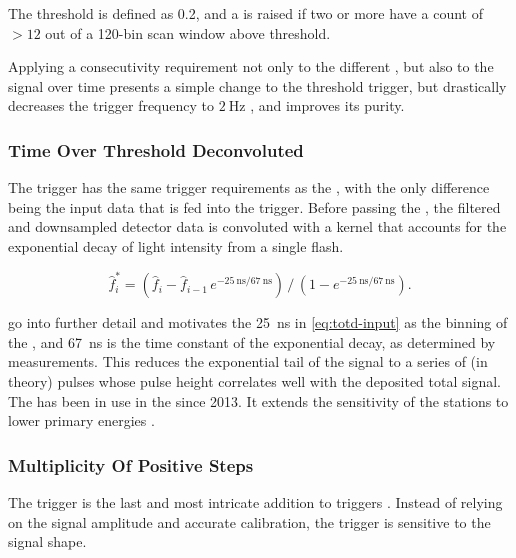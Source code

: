 The threshold is defined as \SI{0.2}{\VemOnline}, and a \TTWO is raised if two 
or more \PMTs have a count of $>12$ out of a 120-bin scan window above 
threshold.

Applying a consecutivity requirement not only to the different \PMTs, but also 
to the signal over time presents a simple change to the \SB threshold trigger, 
but drastically decreases the trigger frequency to $\SI{2}{\hertz}$ 
\cite{ramellaT3RateCompatibility2025}, and improves its purity.

\subsubsection{Time Over Threshold Deconvoluted}

The \ToTd trigger has the same trigger requirements as the \ToT, with the only
difference being the input data that is fed into the trigger. Before passing 
the \ToTd, the filtered and downsampled detector data is convoluted with a 
kernel that accounts for the exponential decay of light intensity from a single
flash.

\begin{equation}
\label{eq:totd-input}
\hat{f}^*_i = \left( \hat{f}_i - \hat{f}_{i-1} \, e^{-\SI{25}{\nano\second}/\SI{67}{\nano\second}} \right)\,/\,\left( 1 - e^{-\SI{25}{\nano\second}/\SI{67}{\nano\second} } \right).
\end{equation}

\cite{billoirPeakSearchingSurface2002, colemanNewTriggerSettings2018} go into 
further detail and motivates the \SI{25}{\nano\second} in \cref{eq:totd-input} 
as the binning of the \UB, and \SI{67}{\nano\second} is the time constant of 
the exponential decay, as determined by measurements. This reduces the 
exponential tail of the \WCD signal to a series of (in theory) \SB pulses whose
pulse height correlates well with the deposited total signal. The \ToTd has 
been in use in the \SD since 2013. It extends the sensitivity of the \SD 
stations to lower \EAS primary energies \cite{billoirFirstResultsToTd2013}.

\subsubsection{Multiplicity Of Positive Steps}

The \MoPS trigger is the last and most intricate addition to \SD \TTWO triggers
\cite{billoirPropositionImproveLocal13}. Instead of relying on the \WCD signal
amplitude and accurate \PMT calibration, the \MoPS trigger is sensitive to the 
signal shape. 

